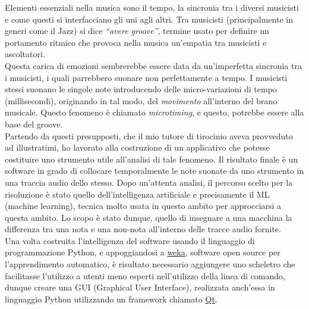 Elementi essenziali nella musica sono il tempo, la sincronia tra i diversi musicisti e come questi si interfacciano gli uni agli altri. Tra musicisti (principalmente in generi come il Jazz) si dice \emph{``avere groove''}, termine usato per definire un portamento ritmico che provoca nella musica un'empatia tra musicisti e ascoltatori\nocite{wiki:groove}.\\
Questa carica di emozioni sembrerebbe essere data da un'imperfetta sincronia tra i musicisti, i quali parrebbero suonare non perfettamente a tempo. I musicisti stessi suonano le singole note introducendo delle micro-variazioni di tempo (millisecondi), originando in tal modo, del \emph{movimento} all'interno del brano musicale. Questo fenomeno è chiamato \emph{microtiming}, e questo, potrebbe essere alla base del groove\nocite{8350302}.\\
Partendo da questi presupposti, che il mio tutore di tirocinio aveva provveduto ad illustratimi, ho lavorato alla costruzione di un applicativo che potesse costituire uno strumento utile all'analisi di tale fenomeno. Il risultato finale è un software in grado di collocare temporalmente le note suonate da uno strumento in una traccia audio dello stesso. Dopo un'attenta analisi, il percorso scelto per la risoluzione è stato quello dell'intelligenza artificiale e precisamente il ML (machine learning), tecnica molto usata in questo ambito \nocite{Wright06towardsmachine}per approcciarsi a questa ambito. Lo scopo è stato dunque, quello di insegnare a una macchina la differenza tra una nota e una non-nota all'interno delle tracce audio fornite.\\
Una volta costruita l'intelligenza del software usando il linguaggio di programmazione 
Python, e appoggiandosi a \href{https://www.cs.waikato.ac.nz/ml/weka/}{weka}, software open source per l'apprendimento automatico, è risultato necessario aggiungere uno scheletro che facilitasse l'utilizzo a utenti meno esperti nell'utilizzo della linea di comando, dunque creare una GUI (Graphical User Interface), realizzata anch'essa in linguaggio Python utilizzando un framework chiamato \href{https://www.qt.io/}{Qt}.\\

